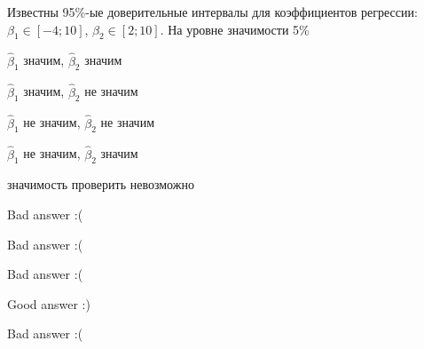 
\begin{question}
Известны 95\%-ые доверительные интервалы для коэффициентов регрессии:
\(\beta_1 \in [-4; 10]\), \(\beta_2 \in [2; 10]\). На уровне значимости 5\%
\begin{answerlist}
  \item \(\hat \beta_1\) значим, \(\hat \beta_2\) значим
  \item \(\hat \beta_1\) значим, \(\hat \beta_2\) не значим
  \item \(\hat \beta_1\) не значим, \(\hat \beta_2\) не значим
  \item \(\hat \beta_1\) не значим, \(\hat \beta_2\) значим
  \item значимость проверить невозможно
\end{answerlist}
\end{question}

\begin{solution}
\begin{answerlist}
  \item Bad answer :(
  \item Bad answer :(
  \item Bad answer :(
  \item Good answer :)
  \item Bad answer :(
\end{answerlist}
\end{solution}

